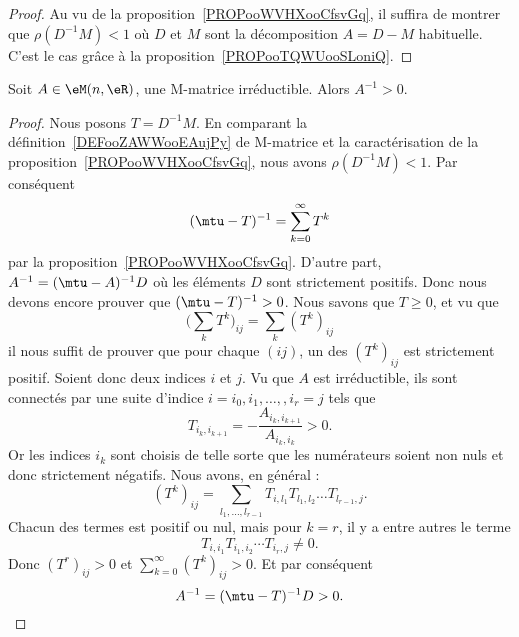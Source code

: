 \begin{proof}
	Au vu de la proposition~\ref{PROPooWVHXooCfsvGq}, il suffira de montrer que \( \rho(D^{-1}M)<1\) où \( D\) et \( M\) sont la décomposition \( A=D-M\) habituelle. C'est le cas grâce à la proposition~\ref{PROPooTQWUooSLoniQ}.
\end{proof}

\begin{proposition}     \label{PROPooZDMQooIZAbKK}
	Soit \( A\in \eM(n,\eR)\), une M-matrice irréductible. Alors \( A^{-1}>0\).
\end{proposition}

\begin{proof}
	Nous posons \( T=D^{-1}M\). En comparant la définition~\ref{DEFooZAWWooEAujPy} de M-matrice et la caractérisation de la proposition~\ref{PROPooWVHXooCfsvGq}, nous avons \( \rho(D^{-1}M)<1\). Par conséquent
	\begin{equation}
		(\mtu-T)^{-1}=\sum_{k=0}^{\infty}T^k
	\end{equation}
	par la proposition~\ref{PROPooWVHXooCfsvGq}. D'autre part, \( A^{-1}=(\mtu-A)^{-1}D\) où les éléments \( D\) sont strictement positifs. Donc nous devons encore prouver que \( (\mtu-T)^{-1}>0\). Nous savons que \( T\geq 0\), et vu que
	\begin{equation}
		\big(\sum_kT^k)_{ij}=\sum_k(T^k)_{ij}
	\end{equation}
	il nous suffit de prouver que pour chaque \( (ij)\), un des \( (T^k)_{ij}\) est strictement positif. Soient donc deux indices \( i\) et \( j\). Vu que \( A\) est irréductible, ils sont connectés par une suite d'indice \( i=i_0,i_1,\ldots, ,i_r=j\) tels que
	\begin{equation}
		T_{i_k,i_{k+1}}=-\frac{ A_{i_k,i_{k+1}} }{ A_{i_k,i_k} }>0.
	\end{equation}
	Or les indices \( i_k\) sont choisis de telle sorte que les numérateurs soient non nuls et donc strictement négatifs. Nous avons, en général :
	\begin{equation}
		(T^k)_{ij}=\sum_{l_1,\ldots, l_{r-1}}T_{i,l_1}T_{l_1,l_2}\ldots T_{l_{r-1},j}.
	\end{equation}
	Chacun des termes est positif ou nul, mais pour \( k=r\), il y a entre autres le terme
	\begin{equation}
		T_{i,i_1}T_{i_1,i_2}\cdots T_{i_r,j}\neq 0.
	\end{equation}
	Donc \( (T^r)_{ij}>0\) et \( \sum_{k=0}^{\infty}(T^k)_{ij}>0\). Et par conséquent
	\begin{equation}
		A^{-1}=(\mtu-T)^{-1}D>0.
	\end{equation}
\end{proof}

